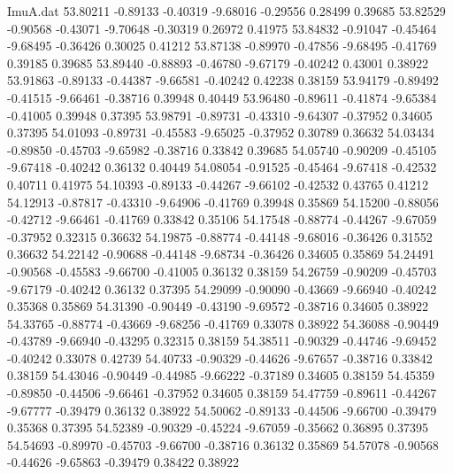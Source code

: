 \begin{filecontents}{ImuA.dat}
  53.80211   -0.89133   -0.40319   -9.68016   -0.29556    0.28499    0.39685
  53.82529   -0.90568   -0.43071   -9.70648   -0.30319    0.26972    0.41975
  53.84832   -0.91047   -0.45464   -9.68495   -0.36426    0.30025    0.41212
  53.87138   -0.89970   -0.47856   -9.68495   -0.41769    0.39185    0.39685
  53.89440   -0.88893   -0.46780   -9.67179   -0.40242    0.43001    0.38922
  53.91863   -0.89133   -0.44387   -9.66581   -0.40242    0.42238    0.38159
  53.94179   -0.89492   -0.41515   -9.66461   -0.38716    0.39948    0.40449
  53.96480   -0.89611   -0.41874   -9.65384   -0.41005    0.39948    0.37395
  53.98791   -0.89731   -0.43310   -9.64307   -0.37952    0.34605    0.37395
  54.01093   -0.89731   -0.45583   -9.65025   -0.37952    0.30789    0.36632
  54.03434   -0.89850   -0.45703   -9.65982   -0.38716    0.33842    0.39685
  54.05740   -0.90209   -0.45105   -9.67418   -0.40242    0.36132    0.40449
  54.08054   -0.91525   -0.45464   -9.67418   -0.42532    0.40711    0.41975
  54.10393   -0.89133   -0.44267   -9.66102   -0.42532    0.43765    0.41212
  54.12913   -0.87817   -0.43310   -9.64906   -0.41769    0.39948    0.35869
  54.15200   -0.88056   -0.42712   -9.66461   -0.41769    0.33842    0.35106
  54.17548   -0.88774   -0.44267   -9.67059   -0.37952    0.32315    0.36632
  54.19875   -0.88774   -0.44148   -9.68016   -0.36426    0.31552    0.36632
  54.22142   -0.90688   -0.44148   -9.68734   -0.36426    0.34605    0.35869
  54.24491   -0.90568   -0.45583   -9.66700   -0.41005    0.36132    0.38159
  54.26759   -0.90209   -0.45703   -9.67179   -0.40242    0.36132    0.37395
  54.29099   -0.90090   -0.43669   -9.66940   -0.40242    0.35368    0.35869
  54.31390   -0.90449   -0.43190   -9.69572   -0.38716    0.34605    0.38922
  54.33765   -0.88774   -0.43669   -9.68256   -0.41769    0.33078    0.38922
  54.36088   -0.90449   -0.43789   -9.66940   -0.43295    0.32315    0.38159
  54.38511   -0.90329   -0.44746   -9.69452   -0.40242    0.33078    0.42739
  54.40733   -0.90329   -0.44626   -9.67657   -0.38716    0.33842    0.38159
  54.43046   -0.90449   -0.44985   -9.66222   -0.37189    0.34605    0.38159
  54.45359   -0.89850   -0.44506   -9.66461   -0.37952    0.34605    0.38159
  54.47759   -0.89611   -0.44267   -9.67777   -0.39479    0.36132    0.38922
  54.50062   -0.89133   -0.44506   -9.66700   -0.39479    0.35368    0.37395
  54.52389   -0.90329   -0.45224   -9.67059   -0.35662    0.36895    0.37395
  54.54693   -0.89970   -0.45703   -9.66700   -0.38716    0.36132    0.35869
  54.57078   -0.90568   -0.44626   -9.65863   -0.39479    0.38422    0.38922

\end{filecontents}
